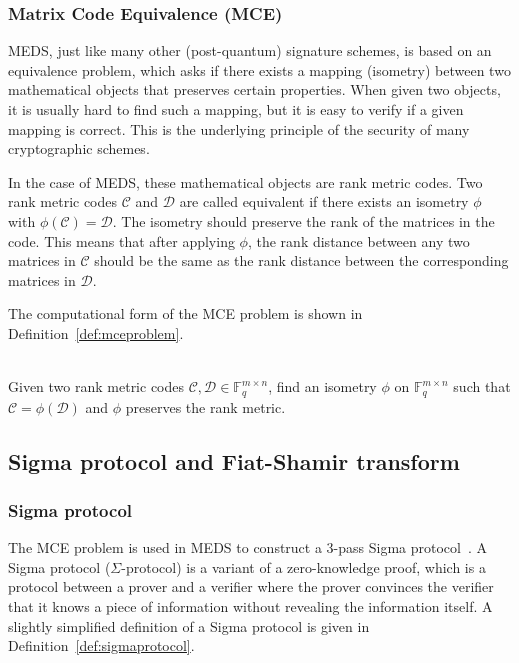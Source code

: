 \documentclass[11pt,a4paper]{report}
\theoremstyle{definition}
\begin{document}
\subsubsection{Matrix Code Equivalence (MCE)}
MEDS, just like many other (post-quantum) signature schemes, is based on an equivalence problem, which asks if there exists a mapping (isometry) between two mathematical objects that preserves certain properties. When given two objects, it is usually hard to find such a mapping, but it is easy to verify if a given mapping is correct. This is the underlying principle of the security of many cryptographic schemes.

In the case of MEDS, these mathematical objects are rank metric codes. Two rank metric codes $\mathcal{C}$ and $\mathcal{D}$ are called equivalent if there exists an isometry $\phi$ with $\phi(\mathcal{C}) = \mathcal{D}$. The isometry should preserve the rank of the matrices in the code. This means that after applying $\phi$, the rank distance between any two matrices in $\mathcal{C}$ should be the same as the rank distance between the corresponding matrices in $\mathcal{D}$.

The computational form of the MCE problem is shown in Definition~\ref{def:mceproblem}.

\begin{definition}~\\
  \label{def:mceproblem}
  Given two rank metric codes $\mathcal{C}, \mathcal{D} \in \mathbb{F}_q^{m \times n}$, find an isometry $\phi$ on $\mathbb{F}_q^{m \times n}$ such that $\mathcal{C} = \phi(\mathcal{D})$ and $\phi$ preserves the rank metric.
\end{definition}

\subsection{Sigma protocol and Fiat-Shamir transform}
\label{sec:medsworks}


\subsubsection{Sigma protocol}
\label{sec:sigmaprotocol}
The MCE problem is used in MEDS to construct a 3-pass Sigma protocol~\cite{damgaard2002sigma}. A Sigma protocol ($\Sigma$-protocol) is a variant of a zero-knowledge proof, which is a protocol between a prover and a verifier where the prover convinces the verifier that it knows a piece of information without revealing the information itself. A slightly simplified definition of a Sigma protocol is given in Definition~\ref{def:sigmaprotocol}.
\end{document}
